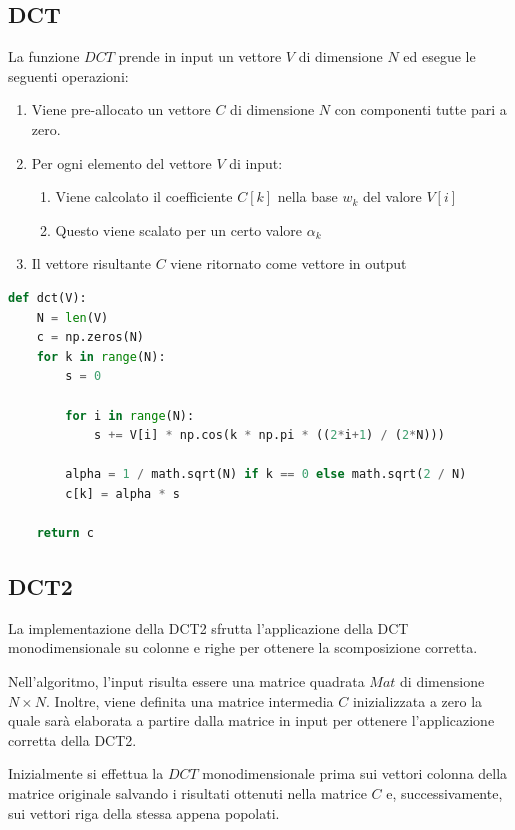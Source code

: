\documentclass[11pt,italian]{article}
\begin{document}
\subsection{DCT}
La funzione $\mathit{DCT}$ prende in input un vettore $V$ di dimensione $N$ ed esegue le seguenti operazioni:
\begin{enumerate}
    \item Viene pre-allocato un vettore $C$ di dimensione $N$ con componenti tutte pari a zero.
    \item Per ogni elemento del vettore $V$ di input:
    \begin{enumerate}
        \item Viene calcolato il coefficiente $C[k]$ nella base $w_k$ del valore $V[i]$
        \item Questo viene scalato per un certo valore $\alpha_k$
    \end{enumerate}
    \item Il vettore risultante $C$ viene ritornato come vettore in output
\end{enumerate}

\begin{lstlisting}[language=python,emph={math,np},caption=Implementazione della DCT monodimensionale]
def dct(V):
    N = len(V)
    c = np.zeros(N)
    for k in range(N):
        s = 0

        for i in range(N):
            s += V[i] * np.cos(k * np.pi * ((2*i+1) / (2*N)))

        alpha = 1 / math.sqrt(N) if k == 0 else math.sqrt(2 / N)
        c[k] = alpha * s

    return c
\end{lstlisting}

\subsection{DCT2}
\label{section:dct2}
La implementazione della DCT2 sfrutta l'applicazione della DCT monodimensionale su colonne e righe per ottenere la scomposizione corretta.

Nell'algoritmo, l'input risulta essere una matrice quadrata $\mathit{Mat}$ di dimensione $N\times N$. Inoltre, viene definita una matrice intermedia $C$ inizializzata a zero la quale sarà elaborata a partire dalla matrice in input per ottenere l'applicazione corretta della DCT2.

Inizialmente si effettua la $\mathit{DCT}$ monodimensionale prima sui vettori colonna della matrice originale salvando i risultati ottenuti nella matrice $C$ e, successivamente, sui vettori riga della stessa appena popolati.
\end{document}
